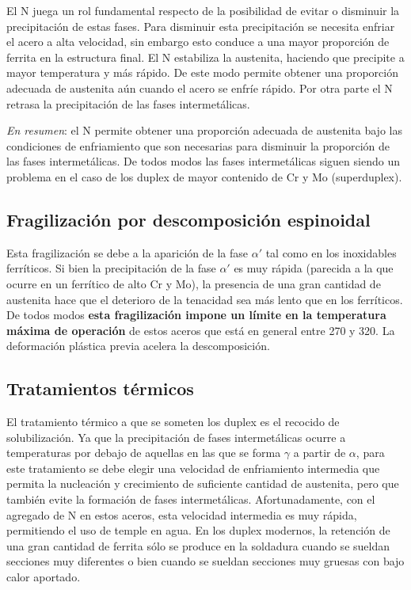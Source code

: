 El N juega un rol fundamental respecto de la posibilidad de evitar o disminuir la precipitación de estas fases. Para disminuir esta precipitación se necesita enfriar el acero a alta velocidad, sin embargo esto conduce a una mayor proporción de ferrita en la estructura final. El N estabiliza la austenita, haciendo que precipite a mayor temperatura y más rápido. De este modo permite obtener una proporción adecuada de austenita aún cuando el acero se enfríe rápido. Por otra parte el N retrasa la precipitación de las fases intermetálicas.

{\it En resumen}: el N permite obtener una proporción adecuada de austenita bajo las condiciones de enfriamiento que son necesarias para disminuir la proporción de las fases intermetálicas. De todos modos las fases intermetálicas siguen siendo un problema en el caso de los duplex de mayor contenido de Cr y Mo (superduplex).

\subsection{Fragilización por descomposición espinoidal}
Esta fragilización se debe a la aparición de la fase $\alpha'$ tal como en los inoxidables ferríticos. Si bien la precipitación de la fase $\alpha'$ es muy rápida (parecida a la que ocurre en un ferrítico de alto Cr y Mo), la presencia de una gran cantidad de austenita hace que el deterioro de la tenacidad sea más lento que en los ferríticos. De todos modos \textbf{esta fragilización impone un límite en la temperatura máxima de operación} de estos aceros que está en general entre 270 y 320\grad. La deformación plástica previa acelera la descomposición.


\subsection{Tratamientos térmicos}

El tratamiento térmico a que se someten los duplex es el recocido de solubilización. Ya que la precipitación de fases intermetálicas ocurre a temperaturas por debajo de aquellas en las que se forma $\gamma$ a partir de $\alpha$, para este tratamiento se debe elegir una velocidad de enfriamiento intermedia que permita la nucleación y crecimiento de suficiente cantidad de austenita, pero que también evite la formación de fases intermetálicas. Afortunadamente, con el agregado de N en estos aceros, esta velocidad intermedia es muy rápida, permitiendo el uso de temple en agua. En los duplex modernos, la retención de una gran cantidad de ferrita sólo se produce en la soldadura cuando se sueldan secciones muy diferentes o bien cuando se sueldan secciones muy gruesas con bajo calor aportado.

